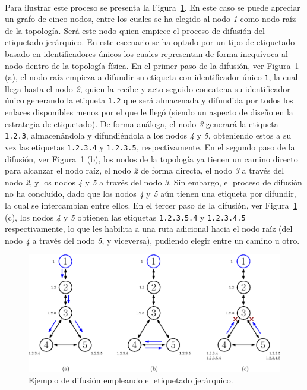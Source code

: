 \\
Para ilustrar este proceso se presenta la Figura~\ref{fig:sota_8_topo_difusion_1}. En este caso se puede apreciar un grafo de cinco nodos, entre los cuales se ha elegido al nodo \textit{1} como nodo raíz de la topología. Será este nodo quien empiece el proceso de difusión del etiquetado jerárquico. En este escenario se ha optado por un tipo de etiquetado basado en identificadores únicos los cuales representan de forma inequívoca al nodo dentro de la topología física. En el primer paso de la difusión, ver  Figura~\ref{fig:sota_8_topo_difusion_1} (a), el nodo raíz empieza a difundir su etiqueta con identificador único \texttt{1}, la cual llega hasta el nodo \textit{2}, quien la recibe y acto seguido concatena su identificador único generando la etiqueta \texttt{1.2} que será almacenada y difundida por todos los enlaces disponibles menos por el que le llegó (siendo un aspecto de diseño en la estrategia de etiquetado). De forma análoga, el nodo \textit{3} generará la etiqueta \texttt{1.2.3}, almacenándola y difundiéndola a los nodos \textit{4} y \textit{5}, obteniendo estos a su vez las etiquetas \texttt{1.2.3.4} y \texttt{1.2.3.5}, respectivamente. En el segundo paso de la difusión, ver  Figura~\ref{fig:sota_8_topo_difusion_1} (b), los nodos de la topología ya tienen un camino directo para alcanzar el nodo raíz, el nodo \textit{2} de forma directa, el nodo \textit{3} a través del nodo \textit{2}, y los nodos \textit{4} y \textit{5} a través del nodo \textit{3}. Sin embargo, el proceso de difusión no ha concluido, dado que los nodos \textit{4} y \textit{5} aún tienen una etiqueta por difundir, la cual se intercambian entre ellos. En el tercer paso de la difusión, ver  Figura~\ref{fig:sota_8_topo_difusion_1} (c), los nodos \textit{4} y \textit{5} obtienen las etiquetas \texttt{1.2.3.5.4} y \texttt{1.2.3.4.5} respectivamente, lo que les habilita a una ruta adicional hacia el nodo raíz (del nodo \textit{4} a través del nodo \textit{5}, y viceversa), pudiendo elegir entre un camino u otro.  

\begin{figure}[ht!]
   \centering
   \includegraphics[width=\textwidth]{fig/02_sota/sota_8_topo_difusion_1.eps}
   \caption{Ejemplo de difusión empleando el etiquetado jerárquico.}
   \label{fig:sota_8_topo_difusion_1}
\end{figure}

